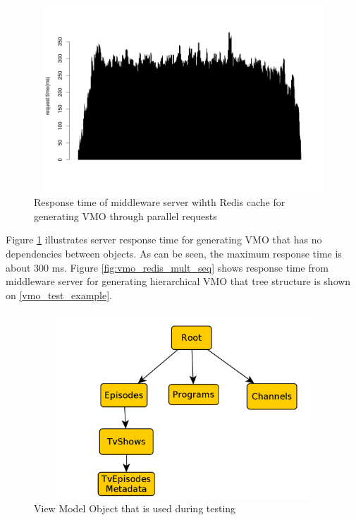 \begin{figure}[h!]
    \centering
    \includegraphics[width=15cm,height=7cm,keepaspectratio]{images/vmo_redis_mult_par.png}
    \caption{Response time of middleware server wihth Redis cache for generating VMO through parallel requests}
    \label{fig:vmo_redis_mult_par}
\end{figure}

Figure \ref{fig:vmo_redis_mult_par} illustrates server response time for generating VMO that has no dependencies between objects. As can be seen, the maximum response time is about 300 ms. Figure \ref{fig:vmo_redis_mult_seq} shows response time from middleware server for generating hierarchical VMO that tree structure is shown on \ref{vmo_test_example}. 

\begin{figure}[h!]
    \centering
    \includegraphics[width=15cm,height=7cm,keepaspectratio]{images/vmo_test_example.png}
    \caption{View Model Object that is used during testing}
    \label{fig:vmo_test_example}
\end{figure}


